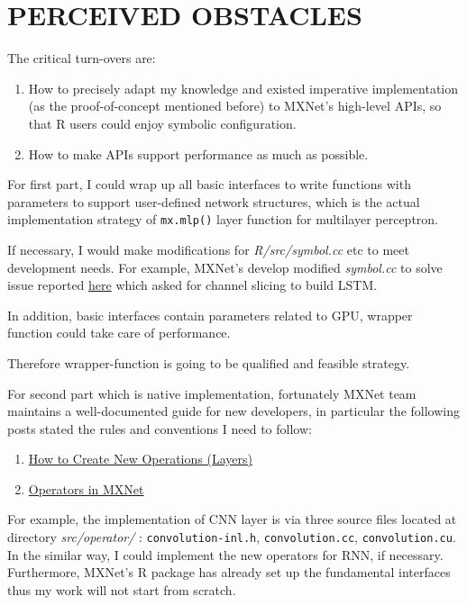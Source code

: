 \documentclass[]{article}
\providecommand{\tightlist}{%
  \setlength{\itemsep}{0pt}\setlength{\parskip}{0pt}}
\begin{document}
\section{PERCEIVED OBSTACLES}\label{perceived-obstacles}

The critical turn-overs are:

\begin{enumerate}
\def\labelenumi{\arabic{enumi}.}
\tightlist
\item
  How to precisely adapt my knowledge and existed imperative
  implementation (as the proof-of-concept mentioned before) to MXNet's
  high-level APIs, so that R users could enjoy symbolic configuration.
\item
  How to make APIs support performance as much as possible.
\end{enumerate}

For first part, I could wrap up all basic interfaces to write functions
with parameters to support user-defined network structures, which is the
actual implementation strategy of \texttt{mx.mlp()} layer function for
multilayer perceptron.

If necessary, I would make modifications for \emph{R/src/symbol.cc} etc
to meet development needs. For example, MXNet's develop modified
\emph{symbol.cc} to solve issue reported
\href{https://github.com/dmlc/mxnet/issues/837\#issuecomment-166937031}{here}
which asked for channel slicing to build LSTM.

In addition, basic interfaces contain parameters related to GPU, wrapper
function could take care of performance.

Therefore wrapper-function is going to be qualified and feasible
strategy.

For second part which is native implementation, fortunately MXNet team
maintains a well-documented guide for new developers, in particular the
following posts stated the rules and conventions I need to follow:

\begin{enumerate}
\def\labelenumi{\arabic{enumi}.}
\tightlist
\item
  \href{http://mxnet.readthedocs.org/en/latest/tutorial/new_op_howto.html}{How
  to Create New Operations (Layers)}
\item
  \href{https://mxnet.readthedocs.org/en/latest/developer-guide/operator.html}{Operators
  in MXNet}
\end{enumerate}

For example, the implementation of CNN layer is via three source files
located at directory \emph{src/operator/} : \texttt{convolution-inl.h},
\texttt{convolution.cc}, \texttt{convolution.cu}. In the similar way, I
could implement the new operators for RNN, if necessary. Furthermore,
MXNet's R package has already set up the fundamental interfaces thus my
work will not start from scratch.
\end{document}
